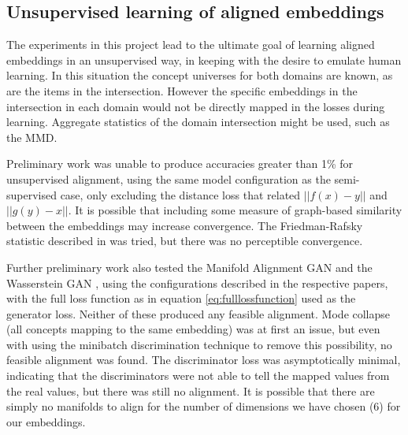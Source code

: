 \subsection{Unsupervised learning of aligned embeddings}

The experiments in this project lead to the ultimate goal of learning aligned embeddings in an unsupervised way, in keeping with the desire to emulate human learning. In this situation the concept universes for both domains are known, as are the items in the intersection. However the specific embeddings in the intersection in each domain would not be directly mapped in the losses during learning. Aggregate statistics of the domain intersection might be used, such as the MMD. 

Preliminary work was unable to produce accuracies greater than 1\% for unsupervised alignment, using the same model configuration as the semi-supervised case, only excluding the distance loss that related $||f(x) - y||$ and $||g(y) - x||$. It is possible that including some measure of graph-based similarity between the embeddings may increase convergence. The Friedman-Rafsky statistic described in \cite{torchtwosample} was tried, but there was no perceptible convergence.

Further preliminary work also tested the Manifold Alignment GAN \cite{magan} and the Wasserstein GAN \cite{WassersteinGAN}, using the configurations described in the respective papers, with the full loss function as in  equation \ref{eq:fulllossfunction} used as the generator loss. Neither of these produced any feasible alignment. Mode collapse (all concepts mapping to the same embedding) was at first an issue, but even with using the minibatch discrimination technique \cite{ImprovedTechniquesTrainingGANS} to remove this possibility, no feasible alignment was found. The discriminator loss was asymptotically minimal, indicating that the discriminators were not able to tell the mapped values from the real values, but there was still no alignment. It is possible that there are simply no manifolds to align for the number of dimensions we have chosen (6) for our embeddings. 

